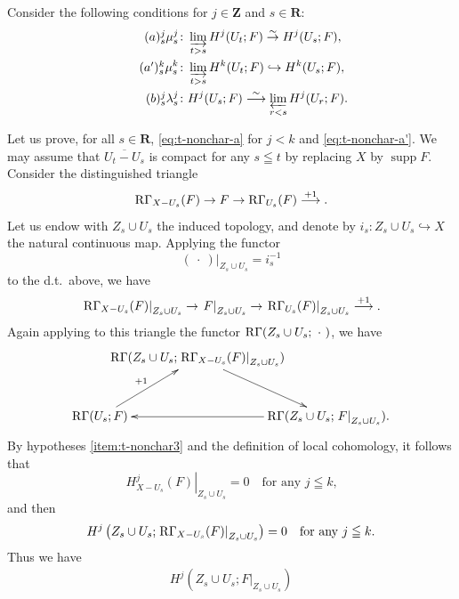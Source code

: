 ﻿\documentclass[a4paper,leqno]{jsarticle}
\makeatletter
\theoremstyle{definition}
\newcommand{\zz}{\mathbf{Z}}
\newcommand{\rr}{\mathbf{R}}
\renewenvironment{proof}[1][\proofname]{\par
  \pushQED{\qed}%
  \normalfont \topsep6\p@\@plus6\p@\relax
  \trivlist
  \item[\hskip\labelsep
         \bfseries
    {#1}]\ignorespaces
}{%
  \popQED\endtrivlist\@endpefalse
}
\renewcommand{\proofname}{Proof.}
\numberwithin{equation}{section}
\newcommand{\supp}{\mathop{\mathrm{supp}}\nolimits}
\newcommand{\RG}{\mathop{\mathrm{R}\hspace{-0pt}\Gamma}\nolimits}
\newcommand{\simar}{\mathrel{\overset{\sim}{\rightarrow}}}%
\newcommand{\simarr}{\mathrel{\overset{\sim}{\longrightarrow}}}%
\newcommand{\indlim}[1][]{\mathop{\varinjlim}\limits_{#1}}
\newcommand{\prolim}[1][]{\mathop{\varprojlim}\limits_{#1}}
\newcommand{\blk}{\mathord{\ \cdot\ }}
\newcommand{\mres}[2][]{{\left.{#1}\right\rvert}_{#2}}
\theoremstyle{mystyle}
\newcommand{\smi}{-}
\makeatother
\begin{document}
\begin{proof}
  Consider the following conditions for 
  \(j\in\zz\) and \(s\in\rr\):
  \begin{align}
      \tag*{\((a)^j_s\)}\label{eq:t-nonchar-a}
      \mu_{s}^{j}&\colon
      \indlim[t>s] H^{j}(U_t;F) \simar H^{j}(U_s;F),\\
      \tag*{\((a')^k_s\)}\label{eq:t-nonchar-a'}
      \mu_{s}^{k}&\colon
      \indlim[t>s] H^{k}(U_t;F) \hookrightarrow H^{k}(U_s;F),\\
      \tag*{\((b)^j_s\)}\label{eq:t-nonchar-b}
      \lambda_{s}^{j}&\colon
      H^{j}(U_s;F)\simarr \prolim[r<s] H^{j}(U_r;F).
  \end{align}

  Let us prove, 
  for all \(s\in \rr\), 
  \ref{eq:t-nonchar-a} for \(j<k\) and \ref{eq:t-nonchar-a'}. 
  We may assume that \(\overline{U_{t}\smi U_{s}}\) is compact 
  for any \(s\leqq t\) by replacing \(X\) by \(\supp{F}\). 
  Consider the distinguished triangle\[
    \RG_{X\smi U_{s}}(F)
    \to
    F
    \to
    \RG_{U_{s}}(F)
    \overset{+1}{\longrightarrow}.
  \]
  Let us endow with \(Z_{s}\cup U_{s}\) the induced topology, and
  denote by \(
    i_{s}\colon Z_{s}\cup U_{s}\hookrightarrow X
  \) the natural continuous map.  
  Applying the functor \[
    \mres[(\blk)]{Z_{s}\cup U_{s}}=i_{s}^{-1}
  \] to the d.t.~above, we have \[
    \mres[\RG_{X\smi U_{s}}(F)]{Z_{s}\cup U_{s}}  
    \to
    \mres[F]{Z_{s}\cup U_{s}}  
    \to
    \mres[\RG_{U_{s}}(F)]{Z_{s}\cup U_{s}}  
    \overset{+1}{\longrightarrow}.
  \]
  Again applying to this triangle the functor \(\RG(Z_{s}\cup U_{s};\blk)\), 
  we have
  \begin{equation}
    \vcenter{\xymatrix@C=-20pt@R=30pt{
      &
      \RG(Z_{s}\cup U_{s};
      \mres[\RG_{X\smi U_{s}}(F)]{Z_{s}\cup U_{s}})
      \ar[rd]
      &
      \\
      \RG(U_{s};F)
      \ar[ru]^-{+1}
      &&
      \RG(Z_{s}\cup U_{s};\mres[F]{Z_{s}\cup U_{s}}).
      \ar[ll]
    }}
  \end{equation}
  By hypotheses \eqref{item:t-nonchar3} and 
  the definition of local cohomology, 
  it follows that
  \[
    \mres[H^{j}_{X\smi U_{s}}(F)]{Z_{s}\cup U_{s}}=0
    \quad
    \text{for any \(j\leqq k\),}
  \]
  and then \[
    H^{j}\left(Z_{s}\cup U_{s};
      \mres[\RG_{X\smi U_{s}}(F)]{Z_{s}\cup U_{s}}
    \right)=0
    \quad
    \text{for any \(j\leqq k\).}
  \]
  Thus we have
  \begin{align}
    \label{eq:a-iso}H^{j}(Z_{s}\cup U_{s};\mres[F]{Z_{s}\cup U_{s}})

\end{align}
\end{proof}
\end{document}
